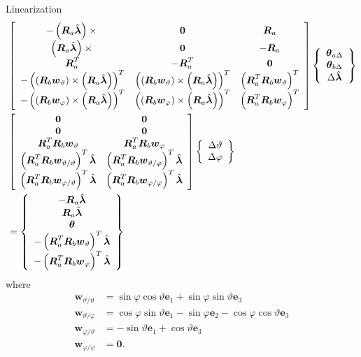 \documentclass[10pt,dvips,fleqn,subeqn]{report}
\newcommand{\T}[1]{\boldsymbol{#1}}
\begin{document}
Linearization
\begin{align}
	& \sqbr{\matr{ccc}{
		-\plbr{\T{R}_a \hat{\T{\lambda}}}\times{} & \T{0} & \T{R}_a \\
%
		\plbr{\T{R}_a \hat{\T{\lambda}}}\times{} & \T{0} & -\T{R}_a \\
%
		\T{R}_a^T & -\T{R}_a^T & \T{0} \\
%
		- \plbr{\plbr{\T{R}_b \T{w}_{\vartheta}}\times\plbr{\T{R}_a \hat{\T{\lambda}}}}^T
			& \plbr{\plbr{\T{R}_b \T{w}_{\vartheta}}\times\plbr{\T{R}_a \hat{\T{\lambda}}}}^T
			& \plbr{\T{R}_a^T \T{R}_b \T{w}_{\vartheta}}^T \\
%
		- \plbr{\plbr{\T{R}_b \T{w}_{\varphi}}\times\plbr{\T{R}_a \hat{\T{\lambda}}}}^T
			& \plbr{\plbr{\T{R}_b \T{w}_{\varphi}}\times\plbr{\T{R}_a \hat{\T{\lambda}}}}^T
			& \plbr{\T{R}_a^T \T{R}_b \T{w}_{\varphi}}^T
	}} \cubr{\cvvect{
		\T{\theta}_{a\Delta} \\
		\T{\theta}_{b\Delta} \\
		\Delta\hat{\T{\lambda}} \\
	}} \nonumber \\
	& \sqbr{\matr{cc}{
		\T{0} & \T{0} \\
%
		\T{0} & \T{0} \\
%
		\T{R}_a^T \T{R}_b \T{w}_{\vartheta}
			& \T{R}_a^T \T{R}_b \T{w}_{\varphi} \\
%
		\plbr{\T{R}_a^T \T{R}_b \T{w}_{\vartheta/\vartheta}}^T \hat{\T{\lambda}}
		& \plbr{\T{R}_a^T \T{R}_b \T{w}_{\vartheta/\varphi}}^T \hat{\T{\lambda}} \\
%
		\plbr{\T{R}_a^T \T{R}_b \T{w}_{\varphi/\vartheta}}^T \hat{\T{\lambda}}
		& \plbr{\T{R}_a^T \T{R}_b \T{w}_{\varphi/\varphi}}^T \hat{\T{\lambda}}
	}} \cubr{\cvvect{
		\Delta\vartheta \\
		\Delta\varphi
	}} \nonumber \\
	&= \cubr{\cvvect{
		-\T{R}_a \hat{\T{\lambda}} \\
		\T{R}_a \hat{\T{\lambda}} \\
		\T{\theta} \\
		- \plbr{\T{R}_a^T \T{R}_b \T{w}_{\vartheta}}^T \hat{\T{\lambda}} \\
		- \plbr{\T{R}_a^T \T{R}_b \T{w}_{\varphi}}^T \hat{\T{\lambda}}
	}}
\end{align}
where
\begin{align}
	\T{w}_{\vartheta/\vartheta}
	&= \sin\varphi \cos\vartheta \T{e}_1
	+ \sin\varphi \sin\vartheta \T{e}_3 \\
	\T{w}_{\vartheta/\varphi}
	&= \cos\varphi \sin\vartheta \T{e}_1
	- \sin\varphi \T{e}_2
	- \cos\varphi \cos\vartheta \T{e}_3 \\
	\T{w}_{\varphi/\vartheta}
	&= - \sin\vartheta \T{e}_1 + \cos\vartheta \T{e}_3 \\
	\T{w}_{\varphi/\varphi}
	&= \T{0} .
\end{align}
\end{document}
